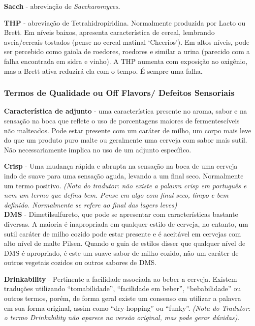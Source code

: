 \textbf{Sacch} - abreviação de \textit{Saccharomyces}.

\textbf{THP} - abreviação de Tetrahidropiridina. Normalmente produzida por Lacto ou Brett. Em níveis baixos, apresenta característica de cereal, lembrando aveia/cereais tostados (pense no cereal matinal ‘Cheerios’). Em altos níveis, pode ser percebido como gaiola de roedores, roedores e similar a urina (parecido com a falha encontrada em sidra e vinho). A THP aumenta com exposição ao oxigênio, mas a Brett ativa reduzirá ela com o tempo. É sempre uma falha.

\subsubsection*{Termos de Qualidade ou Off Flavors/ Defeitos Sensoriais}
\textbf{Característica de adjunto} - uma característica presente no aroma, sabor e na sensação na boca que reflete o uso de porcentagens maiores de fermentescíveis não malteados. Pode estar presente com um caráter de milho, um corpo mais leve do que um produto puro malte ou geralmente uma cerveja com sabor mais sutil. Não necessariamente implica no uso de um adjunto específico.

\textbf{Crisp} - Uma mudança rápida e abrupta na sensação na boca de uma cerveja indo de suave para uma sensação aguda, levando a um final seco. Normalmente um termo positivo.
\textit{(Nota do tradutor: não existe a palavra crisp em português e nem um termo que defina bem. Pense em algo com final seco, limpo e bem definido. Normalmente se refere ao final das lagers leves)}\\

\textbf{DMS} - Dimetilsulfureto, que pode se apresentar com características bastante diversas. A maioria é inapropriada em qualquer estilo de cerveja, no entanto, um sutil caráter de milho cozido pode estar presente e é aceitável em cervejas com alto nível de malte Pilsen. Quando o guia de estilos disser que qualquer nível de DMS é apropriado, é este um suave sabor de milho cozido, não um caráter de outros vegetais cozidos ou outros sabores de DMS.

\textbf{Drinkability} - Pertinente a facilidade associada ao beber a cerveja. Existem traduções utilizando “tomabilidade”, “facilidade em beber”, “bebabilidade” ou outros termos, porém, de forma geral existe um consenso em utilizar a palavra em sua forma original, assim como “dry-hopping” ou “funky”. \textit{(Nota do Tradutor: o termo Drinkability não aparece na versão original, mas pode gerar dúvidas)}.

